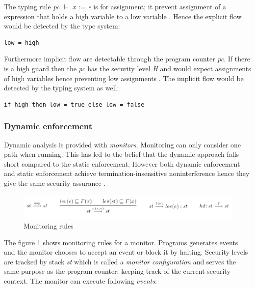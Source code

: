 The typing rule \emph{pc $\vdash$ x := e} is for assignment; it prevent assignment of a expression that holds a high variable to a low variable \cite{Sabelfeld2010}. Hence the explicit flow would be detected by the type system:

\begin{lstlisting}
low = high
\end{lstlisting}

Furthermore implicit flow are detectable through the program counter \emph{pc}. If there is a high guard then the \emph{pc} has the security level \emph{H} and would expect assignments of high variables hence preventing low assignments \cite{Sabelfeld2010}. The implicit flow would be detected by the typing system as well:

\begin{lstlisting}
if high then low = true else low = false
\end{lstlisting}


\subsubsection{Dynamic enforcement}
Dynamic analysis is provided with \emph{monitors}. Monitoring can only consider one path when running. This has led to the belief that the dynamic approach falls short compared to the static enforcement. However both dynamic enforcement and static enforcement achieve termination-insensitive noninterference hence they give the same security assurance \cite{Sabelfeld2010}. 

\begin{figure}[H]
	\centering
	\includegraphics[width=12cm]{figures/monitoringrules.png}
	\caption{ Monitoring rules \cite{Sabelfeld2010}}
	\label{fig:monitoring}
\end{figure}

The figure \ref{fig:monitoring} shows monitoring rules for a monitor. Programs generates events and the monitor chooses to accept an event or block it by halting. Security levels are tracked by stack \emph{st} which is called a \emph{monitor configuration} and serves the same purpose as the program counter; keeping track of the current security context.  The monitor can execute following \emph{events}: 

